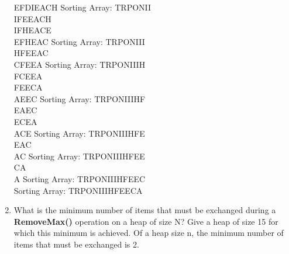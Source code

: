 \documentclass{article}
\begin{document}
\begin{enumerate}
EFDIEACH Sorting Array: TRPONII\\
IFEEACH \\
IFHEACE \\
EFHEAC Sorting Array: TRPONIII \\
HFEEAC \\
CFEEA Sorting Array: TRPONIIIH \\
FCEEA \\
FEECA \\
AEEC Sorting Array: TRPONIIIHF \\
EAEC \\
ECEA \\
ACE Sorting Array: TRPONIIIHFE \\
EAC \\
AC Sorting Array: TRPONIIIHFEE \\
CA \\
A Sorting Array: TRPONIIIHFEEC \\
Sorting Array: TRPONIIIHFEECA \\




\item What is the minimum number of items that must be exchanged during a \textbf{RemoveMax()} operation on a heap of size N? Give a heap of size 15 for which this minimum is achieved. 
Of a heap size n, the minimum number of items that must be exchanged is 2.

\end{enumerate}
\end{document}
